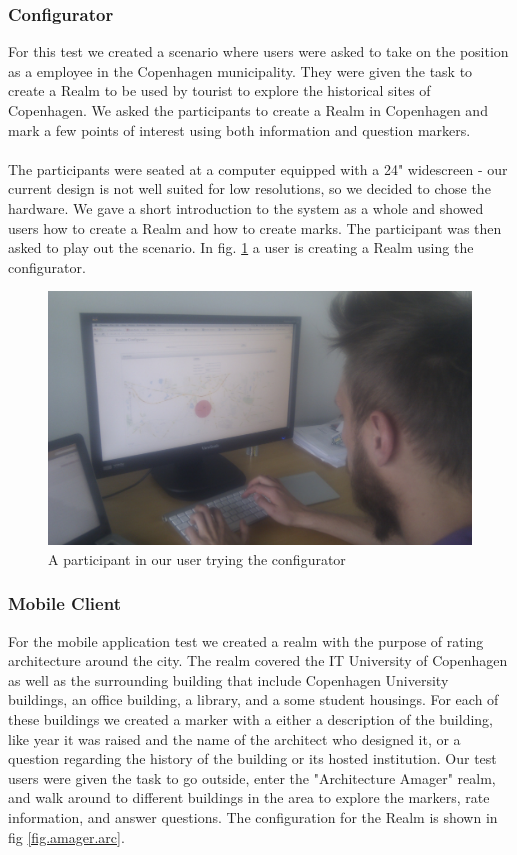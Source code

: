 \subsubsection{Configurator} %
\label{sub:configuration_manager_evaluation}
For this test we created a scenario where users were asked to take on the position as a employee in the Copenhagen municipality. They were given the task to create a Realm to be used by tourist to explore the historical sites of Copenhagen. We asked the participants to create a Realm in Copenhagen and mark a few points of interest using both information and question markers.
\\\\
The participants were seated at a computer equipped with a 24" widescreen - our current design is not well suited for low resolutions, so we decided to chose the hardware. We gave a short introduction to the system as a whole and showed users how to create a Realm and how to create marks. The participant was then asked to play out the scenario. In fig. \ref{fig:testing} a user is creating a Realm using the configurator.

\begin{figure}
	\centering
	\includegraphics[scale=0.14]{fig/testing}
	\caption{A participant in our user trying the configurator}
	\label{fig:testing}
\end{figure}

\subsubsection{Mobile Client} %
\label{sub:android_application_evaluation}
For the mobile application test we created a realm with the purpose of rating architecture around the city. The realm covered the IT University of Copenhagen as well as the surrounding building that include Copenhagen University buildings, an office building, a library, and a some student housings. For each of these buildings we created a marker with a either a description of the building, like year it was raised and the name of the architect who designed it, or a question regarding the history of the building or its hosted institution. Our test users were given the task to go outside, enter the "Architecture Amager" realm, and walk around to different buildings in the area to explore the markers, rate information, and answer questions. The configuration for the Realm is shown in fig \ref{fig.amager.arc}.

